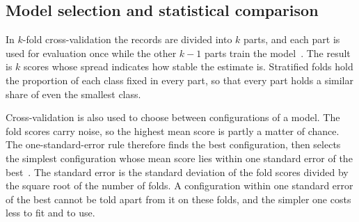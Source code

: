 \documentclass[conference,10pt]{IEEEtran}
\begin{document}
\subsection{Model selection and statistical comparison}
\label{subsec:bg_stats}
%

 In $k$-fold cross-validation the records are divided into $k$
parts, and each part is used for evaluation once while the other $k-1$ parts
train the model~\cite{kohavi1995study}. The result is $k$ scores whose
spread indicates how stable the estimate is. Stratified folds hold the
proportion of each class fixed in every part, so that every part holds a similar share of even the smallest class.

Cross-validation is also used to choose between configurations of a model.
The fold scores carry noise, so the highest mean score is partly a matter of chance. The one-standard-error rule therefore finds
the best configuration, then selects the simplest configuration whose mean
score lies within one standard error of the
best~\cite[Section~7.10]{hastie2009elements}. The standard error is the
standard deviation of the fold scores divided by the square root of the
number of folds. A configuration within one standard error of the best
cannot be told apart from it on these folds, and the simpler one costs less
to fit and to use.
\end{document}
